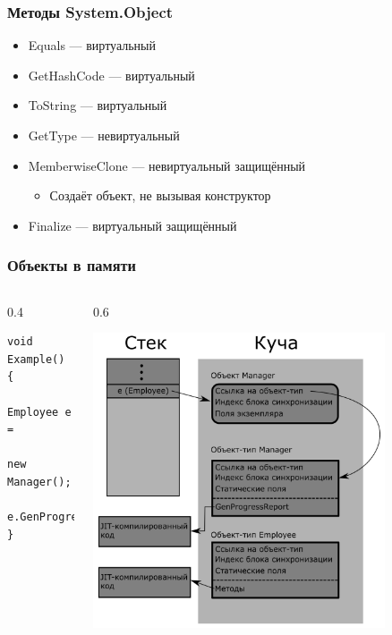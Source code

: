 \documentclass{../../slides-style}
\begin{document}
\begin{frame}
    \frametitle{Методы System.Object}
    \begin{itemize}
        \item Equals --- виртуальный
        \item GetHashCode --- виртуальный
        \item ToString --- виртуальный
        \item GetType --- невиртуальный
        \item MemberwiseClone --- невиртуальный защищённый
        \begin{itemize}
            \item Создаёт объект, не вызывая конструктор
        \end{itemize}
        \item Finalize --- виртуальный защищённый
    \end{itemize}
\end{frame}

\begin{frame}[fragile]
    \frametitle{Объекты в памяти}
    \begin{columns}
        \begin{column}{0.4\textwidth}
            \begin{verbatim}
void Example() 
{
    Employee e = 
        new Manager();
    e.GenProgressReport();
}
            \end{verbatim}
        \end{column}
        \begin{column}{0.6\textwidth}
            \begin{center}
                \includegraphics[width=0.8\textwidth]{objectInMemory.png}
            \end{center}
        \end{column}
    \end{columns}
\end{frame}
\end{document}
